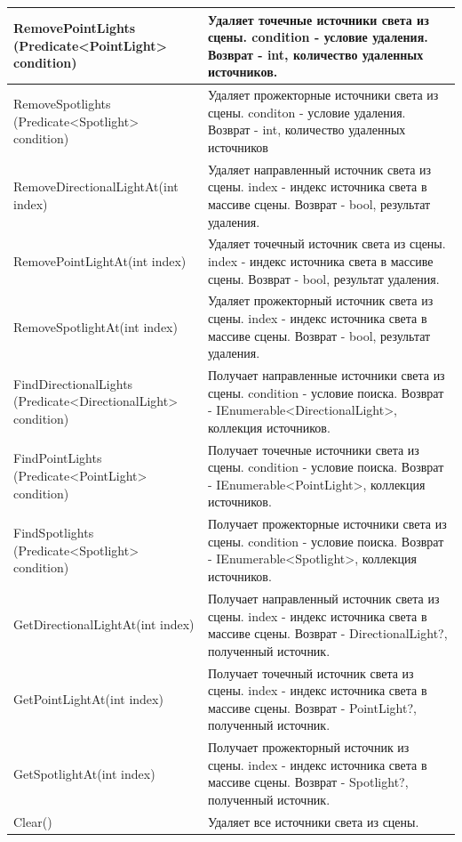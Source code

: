 \begin{xltabular}{\textwidth}{|>{\raggedright\arraybackslash}p{6cm}|>{\raggedright\arraybackslash}X|}
	RemovePointLights
	(Predicate<PointLight> condition) & Удаляет точечные источники света из сцены. condition - условие удаления. Возврат - int, количество удаленных источников. \\ \hline
	RemoveSpotlights
	(Predicate<Spotlight> condition) & Удаляет прожекторные источники света из сцены. conditon - условие удаления. Возврат - int, количество удаленных источников \\ \hline
	RemoveDirectionalLightAt(int index) & Удаляет направленный источник света из сцены. index - индекс источника света в массиве сцены. Возврат - bool, результат удаления. \\ \hline
	RemovePointLightAt(int index) & Удаляет точечный источник света из сцены. index - индекс источника света в массиве сцены. Возврат - bool, результат удаления. \\ \hline
	RemoveSpotlightAt(int index) & Удаляет прожекторный источник света из сцены. index - индекс источника света в массиве сцены. Возврат - bool, результат удаления. \\ \hline
	FindDirectionalLights
	(Predicate<DirectionalLight> condition) & Получает направленные источники света из сцены. condition - условие поиска. Возврат - IEnumerable<DirectionalLight>, коллекция источников. \\ \hline
	FindPointLights
	(Predicate<PointLight> condition) & Получает точечные источники света из сцены. condition - условие поиска. Возврат - IEnumerable<PointLight>, коллекция источников. \\ \hline
	FindSpotlights
	(Predicate<Spotlight> condition) & Получает прожекторные источники света из сцены. condition - условие поиска. Возврат - IEnumerable<Spotlight>, коллекция источников. \\ \hline
	GetDirectionalLightAt(int index) & Получает направленный источник света из сцены. index - индекс источника света в массиве сцены. Возврат - DirectionalLight?, полученный источник. \\ \hline
	GetPointLightAt(int index) & Получает точечный источник света из сцены. index - индекс источника света в массиве сцены. Возврат - PointLight?, полученный источник. \\ \hline
	GetSpotlightAt(int index) & Получает прожекторный источник из сцены. index - индекс источника света в массиве сцены. Возврат - Spotlight?, полученный источник. \\ \hline
	Clear() & Удаляет все источники света из сцены.
\end{xltabular}



